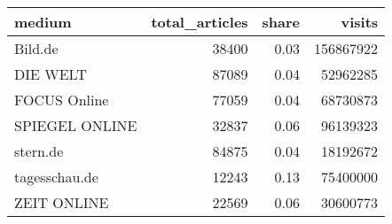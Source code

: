 \begin{table}[ht]
\centering
\begin{tabular}{lrrr}
  \hline
medium & total\_articles & share & visits \\ 
  \hline
Bild.de & 38400 & 0.03 & 156867922 \\ 
  DIE WELT & 87089 & 0.04 & 52962285 \\ 
  FOCUS Online & 77059 & 0.04 & 68730873 \\ 
  SPIEGEL ONLINE & 32837 & 0.06 & 96139323 \\ 
  stern.de & 84875 & 0.04 & 18192672 \\ 
  tagesschau.de & 12243 & 0.13 & 75400000 \\ 
  ZEIT ONLINE & 22569 & 0.06 & 30600773 \\ 
   \hline
\end{tabular}
\end{table}
